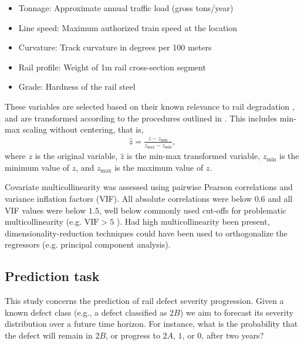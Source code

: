 \documentclass{article}
\begin{document}
\begin{itemize}
    \item Tonnage: Approximate annual traffic load (gross tons/year)
    \item Line speed: Maximum authorized train speed at the location
    \item Curvature: Track curvature in degrees per 100 meters
    \item Rail profile: Weight of 1m rail cross-section segment
    \item Grade: Hardness of the rail steel
\end{itemize}

These variables are selected based on their known relevance to rail degradation \citep{ghofrani2019a,dick2003a,UIC_2002_defecthandbook,RASMUSSEN20178}, and are transformed according to the procedures outlined in \citet{bisgaard2024A}. This includes min-max scaling without centering, that is,
\begin{align*}
    \widehat{z} = \frac{z - z_{\text{min}}}{z_{\text{max}} - z_{\text{min}}},
\end{align*}
where $z$ is the original variable, $\widehat{z}$ is the min-max transformed variable, $z_{\text{min}}$ is the minimum value of $z$, and $z_{\text{max}}$ is the maximum value of $z$. 


Covariate multicollinearity was assessed using pairwise Pearson correlations and variance inflation factors (VIF). All absolute correlations were below $0.6$ and all VIF values were below $1.5$, well below commonly used cut-offs for problematic multicollinearity (e.g. $\text{VIF} > 5$ \citep[Sec. 6.4.1]{sheather2009a}).
Had high multicollinearity been present, dimensionality-reduction techniques could have been used to orthogonalize the regressors (e.g. principal component analysis).



















\subsection{Prediction task} \label{sec:prediction_task}
This study concerns the prediction of rail defect severity progression. Given a known defect class (e.g., a defect classified as $2B$) we aim to forecast its severity distribution over a future time horizon. For instance, what is the probability that the defect will remain in $2B$, or progress to $2A$, $1$, or $0$, after two years?
\end{document}
